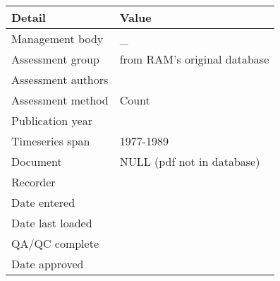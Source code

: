 \begin{table}[htb]
\centering
\begin{tabular}{ll}
\toprule
Detail & Value \\
\midrule
Management body    & \_                           \\
Assessment group   & from RAM's original database \\
Assessment authors &                              \\
Assessment method  & Count                        \\
Publication year   &                              \\
Timeseries span    & 1977-1989                    \\
Document           & NULL (pdf not in database)   \\
Recorder           &                              \\
Date entered       &                              \\
Date last loaded   &                              \\
QA/QC complete     &                              \\
Date approved      &                              \\
\bottomrule
\end{tabular}
\label{tab:assessdet}
\end{table}
